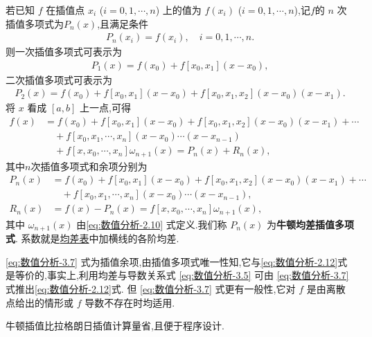 \documentclass[../../main.tex]{subfiles}%
\begin{document}
\begin{theorem}[牛顿均差插值多项式]\label{theorem:牛顿均差插值多项式}
若已知 $f$ 在插值点 $x_i$ ($i = 0, 1, \cdots, n$) 上的值为 $f(x_i)$ ($i = 0, 1, \cdots, n$),记$f$的 $n$ 次插值多项式为$P_n(x)$,且满足条件
\begin{align}
P_n(x_i) = f(x_i), \quad i = 0, 1, \cdots, n. \label{eq:数值分析-3.1}
\end{align}
则一次插值多项式可表示为
\begin{align*}
P_1(x) = f(x_0) + f[x_0, x_1](x - x_0),
\end{align*}
二次插值多项式可表示为
\begin{align*}
P_2(x) = f(x_0) + f[x_0, x_1](x - x_0) + f[x_0, x_1, x_2](x - x_0)(x - x_1).
\end{align*}
将 $x$ 看成 $[a, b]$ 上一点,可得
\begin{align*}
f(x) &= f(x_0) + f[x_0, x_1](x - x_0) + f[x_0, x_1, x_2](x - x_0)(x - x_1) + \cdots \\
&\quad + f[x_0, x_1, \cdots, x_n](x - x_0) \cdots (x - x_{n-1}) \\
&\quad + f[x, x_0, \cdots, x_n]\omega_{n+1}(x) = P_n(x) + R_n(x),
\end{align*}
其中$n$次插值多项式和余项分别为
\begin{align}
P_n(x) &= f(x_0) + f[x_0, x_1](x - x_0) + f[x_0, x_1, x_2](x - x_0)(x - x_1) + \cdots \nonumber  \\
&\quad + f[x_0, x_1, \cdots, x_n](x - x_0) \cdots (x - x_{n-1}),\label{eq:数值分析-3.6} \\
R_n(x) &= f(x) - P_n(x) = f[x, x_0, \cdots, x_n]\omega_{n+1}(x),\label{eq:数值分析-3.7}
\end{align}
其中 $\omega_{n+1}(x)$ 由\eqref{eq:数值分析-2.10} 式定义.我们称 $P_n(x)$ 为\textbf{牛顿均差插值多项式}. 系数就是\hyperref[table:均差表]{均差表}中加横线的各阶均差.
\end{theorem}
\begin{remark}
\eqref{eq:数值分析-3.7} 式为插值余项,由插值多项式唯一性知,它与\eqref{eq:数值分析-2.12}式是等价的,事实上,利用均差与导数关系式 \eqref{eq:数值分析-3.5} 可由 \eqref{eq:数值分析-3.7} 式推出\eqref{eq:数值分析-2.12}式. 但 \eqref{eq:数值分析-3.7} 式更有一般性,它对 $f$ 是由离散点给出的情形或 $f$ 导数不存在时均适用.
\end{remark}
\begin{remark}
牛顿插值比拉格朗日插值计算量省,且便于程序设计.
\end{remark}
\end{document}
